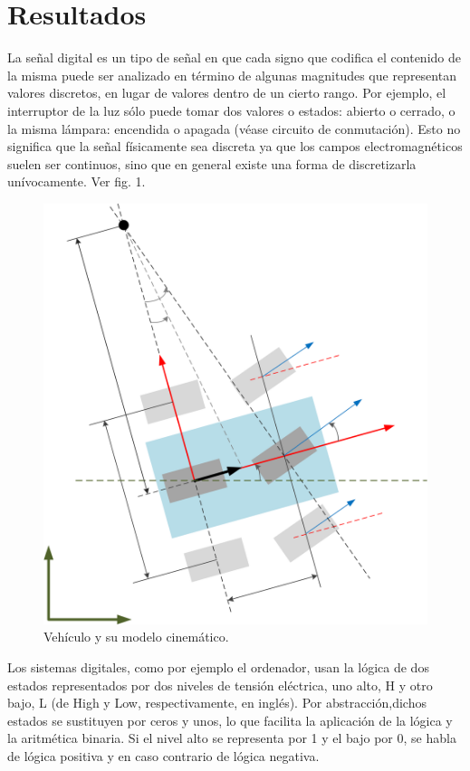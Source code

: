 \documentclass[conference,compsoc,onecolumn]{IEEEtran}
\begin{document}
\section{\normalfont Resultados}
\label{sec:results}
La señal digital es un tipo de señal en que cada signo que codifica el contenido de la misma puede ser analizado
en término de algunas magnitudes que representan valores discretos, en lugar de valores dentro de un cierto rango.
Por ejemplo, el interruptor de la luz sólo puede tomar dos valores o estados: abierto o cerrado, o la misma lámpara:
encendida o apagada (véase circuito de conmutación). Esto no significa que la señal físicamente sea discreta ya que los
campos electromagnéticos suelen ser continuos, sino que en general existe una forma de discretizarla unívocamente.
Ver fig. 1.
 \begin{figure}[h!]
\centering
\includegraphics[scale=0.5]{bib/.png}
\caption{Vehículo y su modelo cinemático.}
\label{fig:imagen laboratorio 1}
\end{figure}

Los sistemas digitales, como por ejemplo el ordenador, usan la lógica de dos estados representados por dos
niveles de tensión eléctrica, uno alto, H y otro bajo, L (de High y Low, respectivamente, en inglés). Por abstracción,dichos estados se sustituyen por ceros y unos, lo que facilita la aplicación de la lógica y la aritmética binaria. Si el
nivel alto se representa por 1 y el bajo por 0, se habla de lógica positiva y en caso contrario de lógica negativa.
\end{document}
